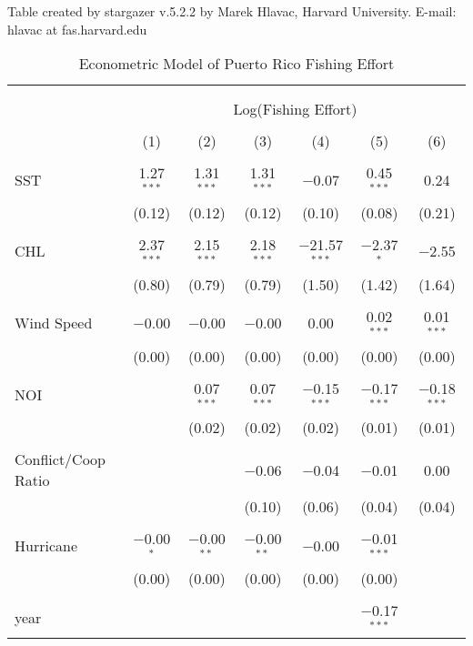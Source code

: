 \documentclass[10pt]{article}
\begin{document}
 Table created by stargazer v.5.2.2 by Marek Hlavac, Harvard University. E-mail: hlavac at fas.harvard.edu
\begin{table}[!htbp] \centering 
  \caption{Econometric Model of Puerto Rico Fishing Effort} 
  \label{} 
\footnotesize 
\begin{tabular}{@{\extracolsep{5pt}}lcccccc} 
\\[-1.8ex]\hline 
\hline \\[-1.8ex] 
\\[-1.8ex] & \multicolumn{6}{c}{Log(Fishing Effort)} \\ 
\\[-1.8ex] & (1) & (2) & (3) & (4) & (5) & (6)\\ 
\hline \\[-1.8ex] 
 SST & 1.27$^{***}$ & 1.31$^{***}$ & 1.31$^{***}$ & $-$0.07 & 0.45$^{***}$ & 0.24 \\ 
  & (0.12) & (0.12) & (0.12) & (0.10) & (0.08) & (0.21) \\ 
  & & & & & & \\ 
 CHL & 2.37$^{***}$ & 2.15$^{***}$ & 2.18$^{***}$ & $-$21.57$^{***}$ & $-$2.37$^{*}$ & $-$2.55 \\ 
  & (0.80) & (0.79) & (0.79) & (1.50) & (1.42) & (1.64) \\ 
  & & & & & & \\ 
 Wind Speed & $-$0.00 & $-$0.00 & $-$0.00 & 0.00 & 0.02$^{***}$ & 0.01$^{***}$ \\ 
  & (0.00) & (0.00) & (0.00) & (0.00) & (0.00) & (0.00) \\ 
  & & & & & & \\ 
 NOI &  & 0.07$^{***}$ & 0.07$^{***}$ & $-$0.15$^{***}$ & $-$0.17$^{***}$ & $-$0.18$^{***}$ \\ 
  &  & (0.02) & (0.02) & (0.02) & (0.01) & (0.01) \\ 
  & & & & & & \\ 
 Conflict/Coop Ratio &  &  & $-$0.06 & $-$0.04 & $-$0.01 & 0.00 \\ 
  &  &  & (0.10) & (0.06) & (0.04) & (0.04) \\ 
  & & & & & & \\ 
 Hurricane & $-$0.00$^{*}$ & $-$0.00$^{**}$ & $-$0.00$^{**}$ & $-$0.00 & $-$0.01$^{***}$ &  \\ 
  & (0.00) & (0.00) & (0.00) & (0.00) & (0.00) &  \\ 
  & & & & & & \\ 
 year &  &  &  &  & $-$0.17$^{***}$ &  \\ 

\end{tabular}
\end{table}
\end{document}
